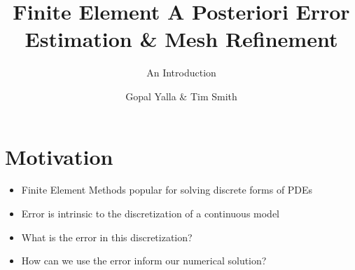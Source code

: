 \documentclass[pdf]{beamer}
\title{Finite Element A Posteriori Error Estimation \& Mesh Refinement}
\subtitle{An Introduction}
\author{Gopal Yalla \& Tim Smith}
\begin{document}
 \begin{frame}
  \titlepage
 \end{frame}
 
 \begin{frame}
  \tableofcontents
 \end{frame}
 
 \section{Motivation}
 \begin{frame}
  \begin{itemize}
	\item Finite Element Methods popular for solving discrete forms of PDEs
	\item Error is intrinsic to the discretization of a continuous model
	\item What is the error in this discretization?
	\item How can we use the error inform our numerical solution?	
   \end{itemize}
  \end{frame}
  \begin{frame}
 \end{frame}
 \begin{frame}
 \end{frame}

 
 \begin{frame}
  \begin{itemize}
  \end{itemize}
 \end{frame}
 
 \begin{frame}
  \begin{itemize}
  \end{itemize}
 \end{frame}
 
 \begin{frame}
 \end{frame}
 
\end{document}
